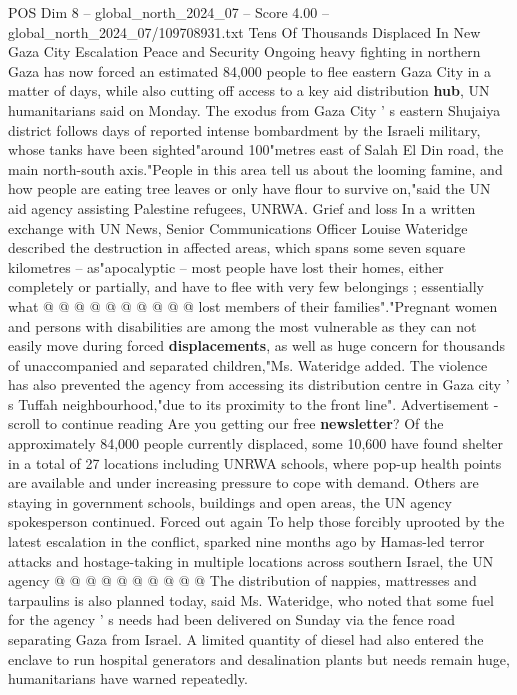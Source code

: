 \begin{textsample}{POS Dim 8 – global\_north\_2024\_07 – Score 4.00 – global\_north\_2024\_07/109708931.txt}  \label{ex:f8_pos_266}
Tens Of Thousands Displaced In New Gaza City Escalation Peace and Security Ongoing heavy fighting in northern Gaza has now forced an estimated 84,000 people to flee eastern Gaza City in a matter of days, while also cutting off access to a key aid distribution \textbf{hub}, UN humanitarians said on Monday.
The exodus from Gaza City ' s eastern Shujaiya district follows days of reported intense bombardment by the Israeli military, whose tanks have been sighted"around 100"metres east of Salah El Din road, the main north-south axis."People in this area tell us about the looming famine, and how people are eating tree leaves or only have flour to survive on,"said the UN aid agency assisting Palestine refugees, UNRWA.
Grief and loss In a written exchange with UN News, Senior Communications Officer Louise Wateridge described the destruction in affected areas, which spans some seven square kilometres -- as"apocalyptic -- most people have lost their homes, either completely or partially, and have to flee with very few belongings ; essentially what @ @ @ @ @ @ @ @ @ @ lost members of their families"."Pregnant women and persons with disabilities are among the most vulnerable as they can not easily move during forced \textbf{displacements}, as well as huge concern for thousands of unaccompanied and separated children,"Ms.
Wateridge added.
The violence has also prevented the agency from accessing its distribution centre in Gaza city ' s Tuffah neighbourhood,"due to its proximity to the front line".
Advertisement - scroll to continue reading Are you getting our free \textbf{newsletter}?
Of the approximately 84,000 people currently displaced, some 10,600 have found shelter in a total of 27 locations including UNRWA schools, where pop-up health points are available and under increasing pressure to cope with demand.
Others are staying in government schools, buildings and open areas, the UN agency spokesperson continued.
Forced out again To help those forcibly uprooted by the latest escalation in the conflict, sparked nine months ago by Hamas-led terror attacks and hostage-taking in multiple locations across southern Israel, the UN agency @ @ @ @ @ @ @ @ @ @ The distribution of nappies, mattresses and tarpaulins is also planned today, said Ms.
Wateridge, who noted that some fuel for the agency ' s needs had been delivered on Sunday via the fence road separating Gaza from Israel.
A limited quantity of diesel had also entered the enclave to run hospital generators and desalination plants but needs remain huge, humanitarians have warned repeatedly.

\end{textsample}
